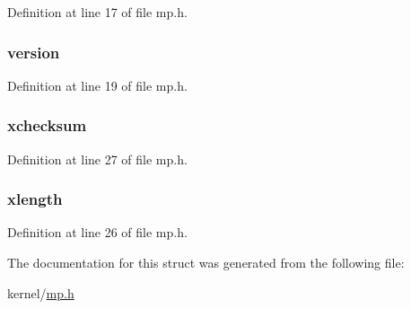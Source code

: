 Definition at line 17 of file mp.\-h.

\hypertarget{structmpconf_aa6ea6b1d12a723848cc34b199ddd8aef}{
\subsubsection[{version}]{ version}}\label{structmpconf_aa6ea6b1d12a723848cc34b199ddd8aef}


Definition at line 19 of file mp.\-h.

\hypertarget{structmpconf_a6f8d578004c11e0bdbf514588ccb1697}{
\subsubsection[{xchecksum}]{ xchecksum}}\label{structmpconf_a6f8d578004c11e0bdbf514588ccb1697}


Definition at line 27 of file mp.\-h.

\hypertarget{structmpconf_a74abe1c31d3783b9bb39334ffad032b6}{
\subsubsection[{xlength}]{ xlength}}\label{structmpconf_a74abe1c31d3783b9bb39334ffad032b6}


Definition at line 26 of file mp.\-h.



The documentation for this struct was generated from the following file\-:\begin{DoxyCompactItemize}
\item 
kernel/\hyperlink{mp_8h}{mp.\-h}\end{DoxyCompactItemize}
